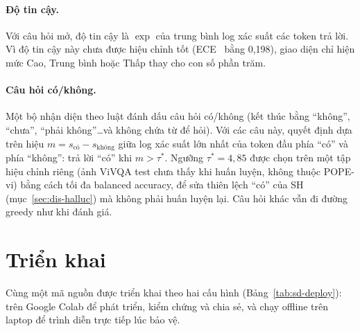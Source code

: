 \paragraph{Độ tin cậy.} Với câu hỏi mở, độ tin cậy là $\exp$ của trung bình log
xác suất các token trả lời. Vì độ tin cậy này chưa được hiệu chỉnh tốt
(ECE~\cite{guo2017calibration} bằng 0,198), giao diện chỉ hiện mức Cao, Trung bình
hoặc Thấp thay cho con số phần trăm.

\paragraph{Câu hỏi có/không.} Một bộ nhận diện theo luật đánh dấu câu hỏi có/không
(kết thúc bằng ``không'', ``chưa'', ``phải không''\ldots và không chứa từ để hỏi).
Với các câu này, quyết định dựa trên hiệu $m = s_{\text{có}} - s_{\text{không}}$
giữa log xác suất lớn nhất của token đầu phía ``có'' và phía ``không'': trả lời
``có'' khi $m > \tau^*$. Ngưỡng $\tau^* = 4{,}85$ được chọn trên một tập hiệu
chỉnh riêng (ảnh ViVQA test chưa thấy khi huấn luyện, không thuộc POPE-vi) bằng
cách tối đa balanced accuracy, để sửa thiên lệch ``có'' của SH
(mục~\ref{sec:dis-halluc}) mà không phải huấn luyện lại. Câu hỏi khác vẫn đi
đường greedy như khi đánh giá.

\section{Triển khai}
\label{sec:sd-deploy}

Cùng một mã nguồn được triển khai theo hai cấu hình (Bảng~\ref{tab:sd-deploy}): trên Google
Colab để phát triển, kiểm chứng và chia sẻ, và chạy offline trên laptop để trình diễn trực
tiếp lúc bảo vệ.

